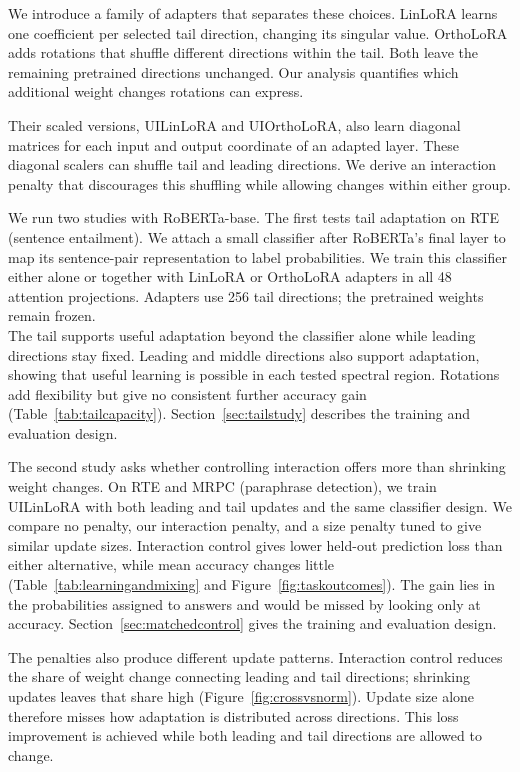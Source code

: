 \documentclass{article}
\begin{document}
We introduce a family of adapters that separates these choices. LinLoRA learns one coefficient per selected tail direction, changing its singular value. OrthoLoRA adds rotations that shuffle different directions within the tail. Both leave the remaining pretrained directions unchanged. Our analysis quantifies which additional weight changes rotations can express.

Their scaled versions, UILinLoRA and UIOrthoLoRA, also learn diagonal matrices for each input and output coordinate of an adapted layer. These diagonal scalers can shuffle tail and leading directions. We derive an interaction penalty that discourages this shuffling while allowing changes within either group.

We run two studies with RoBERTa-base. The first tests tail adaptation on RTE (sentence entailment). We attach a small classifier after RoBERTa's final layer to map its sentence-pair representation to label probabilities. We train this classifier either alone or together with LinLoRA or OrthoLoRA adapters in all 48 attention projections. Adapters use 256 tail directions; the pretrained weights remain frozen. \\
The tail supports useful adaptation beyond the classifier alone while leading directions stay fixed. Leading and middle directions also support adaptation, showing that useful learning is possible in each tested spectral region. Rotations add flexibility but give no consistent further accuracy gain (Table~\ref{tab:tailcapacity}). Section~\ref{sec:tailstudy} describes the training and evaluation design.

The second study asks whether controlling interaction offers more than shrinking weight changes. On RTE and MRPC (paraphrase detection), we train UILinLoRA with both leading and tail updates and the same classifier design. We compare no penalty, our interaction penalty, and a size penalty tuned to give similar update sizes. Interaction control gives lower held-out prediction loss than either alternative, while mean accuracy changes little (Table~\ref{tab:learningandmixing} and Figure~\ref{fig:taskoutcomes}). The gain lies in the probabilities assigned to answers and would be missed by looking only at accuracy. Section~\ref{sec:matchedcontrol} gives the training and evaluation design.

The penalties also produce different update patterns. Interaction control reduces the share of weight change connecting leading and tail directions; shrinking updates leaves that share high (Figure~\ref{fig:crossvsnorm}). Update size alone therefore misses how adaptation is distributed across directions. This loss improvement is achieved while both leading and tail directions are allowed to change.
\end{document}
